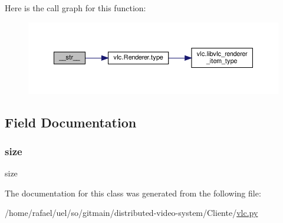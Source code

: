 Here is the call graph for this function\+:
\nopagebreak
\begin{figure}[H]
\begin{center}
\leavevmode
\includegraphics[width=350pt]{classvlc_1_1_log_message_a23e8041ce1015febe4fdace3225714f9_cgraph}
\end{center}
\end{figure}


\subsection{Field Documentation}
\mbox{\label{classvlc_1_1_log_message_aa3d6656320f1a7278c0c2c7fdf07617c}} 
\subsubsection{\texorpdfstring{size}{size}}
{\footnotesize\ttfamily size}



The documentation for this class was generated from the following file\+:\begin{DoxyCompactItemize}
\item 
/home/rafael/uel/so/gitmain/distributed-\/video-\/system/\+Cliente/\hyperlink{vlc_8py}{vlc.\+py}\end{DoxyCompactItemize}

